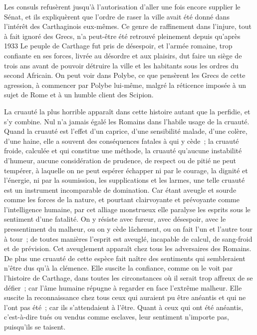 \documentclass[french,twoside]{book} %
\begin{document}
\par
Les consuls refusèrent jusqu'à l'autorisation d'aller une fois encore supplier le Sénat, et ils expliquèrent que l'ordre de raser la ville avait été donné dans l'intérêt des Carthaginois eux-mêmes. Ce genre de raffinement dans l'injure, tout à fait ignoré des Grecs, n'a peut-être été retrouvé pleinement depuis qu'après 1933 Le peuple de Carthage fut pris de désespoir, et l'armée romaine, trop confiante en ses forces, livrée au désordre et aux plaisirs, dut faire un siège de trois ans avant de pouvoir détruire la ville et les habitants sous les ordres du second Africain. On peut voir dans Polybe, ce que pensèrent les Grecs de cette agression, à commencer par Polybe lui-même, malgré la réti­cence imposée à un sujet de Rome et à un humble client des Scipion.\par
La cruauté la plus horrible apparaît dans cette histoire autant que la perfidie, et s'y combine. Nul n'a jamais égalé les Romains dans l'habile usage de la cruauté. Quand la cruauté est l'effet d'un caprice, d'une sensibilité mala­de, d'une colère, d'une haine, elle a souvent des conséquences fatales à qui y cède ; la cruauté froide, calculée et qui constitue une méthode, la cruauté qu'aucune instabilité d'humeur, aucune considération de prudence, de respect ou de pitié ne peut tempérer, à laquelle on ne peut espérer échapper ni par le courage, la dignité et l'énergie, ni par la soumission, les supplications et les larmes, une telle cruauté est un instrument incomparable de domination. Car étant aveugle et sourde comme les forces de la nature, et pourtant clairvoyante et prévoyante comme l'intelligence humaine, par cet alliage monstrueux elle paralyse les esprits sous le sentiment d'une fatalité. On y résiste avec fureur, avec désespoir, avec le pressentiment du malheur, ou on y cède lâchement, ou on fait l'un et l'autre tour à tour ; de toutes manières l'esprit est aveuglé, incapable de calcul, de sang-froid et de prévision. Cet aveuglement apparaît chez tous les adversaires des Romains. De plus une cruauté de cette espèce fait naître des sentiments qui sembleraient n'être dus qu'à la clémence. Elle suscite la confiance, comme on le voit par l'histoire de Carthage, dans toutes les circonstances où il serait trop affreux de se défier ; car l'âme humaine répugne à regarder en face l'extrême malheur. Elle suscite la reconnaissance chez tous ceux qui auraient pu être anéantis et qui ne l'ont pas été ; car ils s'attendaient à l'être. Quant à ceux qui ont été anéantis, c'est-à-dire tués ou vendus comme esclaves, leur sentiment n'importe pas, puisqu'ils se taisent.\par
\end{document}
